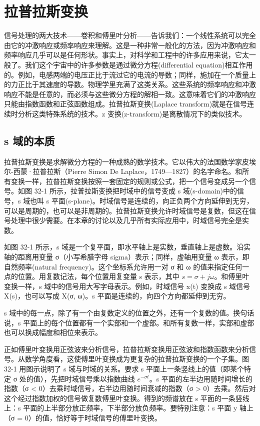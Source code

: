 
\chapter{拉普拉斯变换}\label{ch-32}

信号处理的两大技术------卷积和傅里叶分析------告诉我们：一个线性系统可以完全由它的冲激响应或频率响应来理解。这是一种非常一般化的方法，因为冲激响应和频率响应几乎可以是任何形状。事实上，对科学和工程中的许多应用来说，它太一般了。我们这个宇宙中的许多参数是通过微分方程(differential
equation)相互作用的。例如，电感两端的电压正比于流过它的电流的导数；同样，施加在一个质量上的力正比于其速度的导数。物理学里充满了这类关系。这些系统的频率响应和冲激响应不能是任意的，而必须与这些微分方程的解相一致。这意味着它们的冲激响应只能由指数函数和正弦函数组成。拉普拉斯变换(Laplace
transform)就是在信号连续时分析这类特殊系统的技术。z
变换(z-transform)是离散情况下的类似技术。

\section{s 域的本质}

拉普拉斯变换是求解微分方程的一种成熟的数学技术。它以伟大的法国数学家皮埃尔-西蒙·拉普拉斯（Pierre
Simon De
Laplace，1749---1827）的名字命名。和所有变换一样，拉普拉斯变换按照一套固定的规则或公式，把一个信号变成另一个信号。如图
32-1 所示，拉普拉斯变换把时域中的信号变成 s 域(s-domain)中的信号，s
域也叫 s
平面(s-plane)。时域信号是连续的，向正负两个方向延伸到无穷，可以是周期的，也可以是非周期的。拉普拉斯变换允许时域信号是复数，但这在信号处理中很少需要。在本章的讨论以及几乎所有实际应用中，时域信号完全是实数。

如图 32-1 所示，s
域是一个复平面，即水平轴上是实数，垂直轴上是虚数。沿实轴的距离用变量
σ（小写希腊字母 sigma）表示；同样，虚轴用变量 ω 表示，即自然频率(natural
frequency)。这个坐标系允许用一对 σ 和 ω
的值来指定任何一点的位置。用复数记法，每个位置用复变量 s 表示，其中
\(s = \sigma + j\omega\)。和傅里叶变换一样，s
域中的信号用大写字母表示。例如，时域信号 x(t) 变换成 s 域信号
X(s)，也可以写成 X(σ, ω)。s 平面是连续的，向四个方向都延伸到无穷。

s
域中的每一点，除了有一个由复数定义的位置之外，还有一个复数的值。换句话说，s
平面上的每个位置都有一个实部和一个虚部。和所有复数一样，实部和虚部也可以换成幅度和相位来表示。

正如傅里叶变换用正弦波来分析信号，拉普拉斯变换用正弦波和指数函数来分析信号。从数学角度看，这使傅里叶变换成为更复杂的拉普拉斯变换的一个子集。图
32-1 用图示说明了 s 域与时域的关系。要求 s
平面上一条竖线上的值（即某个特定 σ 处的值），先把时域信号乘以指数曲线
\(e^{-\sigma t}\)。s 平面的左半边用随时间增长的指数（σ \textless{}
0）去乘时域信号，右半边用随时间衰减的指数（σ \textgreater{}
0）去乘。然后对这个经过指数加权的信号做复数傅里叶变换。得到的频谱放在 s
平面的一条竖线上：s
平面的上半部分放正频率，下半部分放负频率。要特别注意：s 平面 y 轴上（σ =
0）的值，恰好等于时域信号的傅里叶变换。

